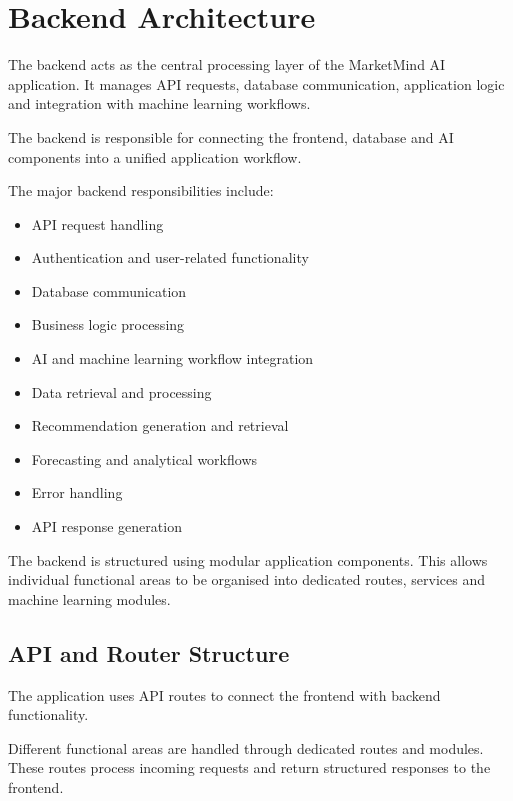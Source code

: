 \documentclass[12pt,a4paper]{report}
\begin{document}

\section{Backend Architecture}

The backend acts as the central processing layer of the MarketMind AI
application. It manages API requests, database communication,
application logic and integration with machine learning workflows.

The backend is responsible for connecting the frontend, database and AI
components into a unified application workflow.

The major backend responsibilities include:

\begin{itemize}[leftmargin=1.2cm]
    \item API request handling
    \item Authentication and user-related functionality
    \item Database communication
    \item Business logic processing
    \item AI and machine learning workflow integration
    \item Data retrieval and processing
    \item Recommendation generation and retrieval
    \item Forecasting and analytical workflows
    \item Error handling
    \item API response generation
\end{itemize}

The backend is structured using modular application components. This
allows individual functional areas to be organised into dedicated routes,
services and machine learning modules.

\subsection{API and Router Structure}

The application uses API routes to connect the frontend with backend
functionality.

Different functional areas are handled through dedicated routes and
modules. These routes process incoming requests and return structured
responses to the frontend.
\end{document}
